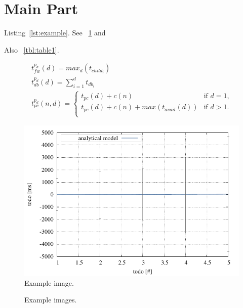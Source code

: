 \section{Main Part}\label{sec:main}

Listing~\ref{lst:example}.
See \figurename~\ref{fig:example1} and

Also \tablename~\ref{tbl:table1}.

\lstset{language=Java, caption=Example Code, label=lst:example}


\small
\begin{equation}
  \begin{array}{l}
    \displaystyle t^{p_d}_{fw}(d) = max_{d}(t_{child_{i}}) \\
    \displaystyle t^{p_d}_{db}(d) = \sum_{i=1}^{d} t_{db_{i}} \\
    \displaystyle t^{p_d}_{pc}(n,d) =
    	\begin{cases}
        	t_{pc}(d) + c(n) & \text{if $d = 1$,}\\
        	t_{pc}(d) + c(n) + max(t_{avail}(d)) & \text{if $d>1$.}\\
        \end{cases}
  \end{array}
  \label{eq:var_idb}
\end{equation}
\normalsize

\begin{figure}
    \centering
    \includegraphics[width=.45\textwidth]{resources/images/example1.pdf} 
    \caption{Example image.}
    \label{fig:example1}
\end{figure}

\begin{figure}
    \centering
    \caption{Example images.}
    \label{fig:exammple2_3}
\end{figure}

